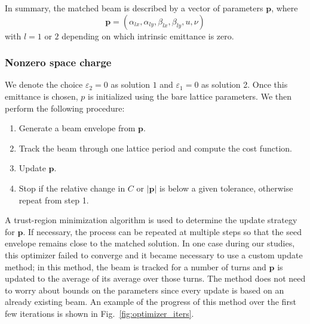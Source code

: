 %

In summary, the matched beam is described by a vector of parameters $\mathbf{p}$, where
%
\begin{equation} \label{eq:twiss_params_4D}
    \mathbf{p} = (\alpha_{lx}, \alpha_{ly}, \beta_{lx}, \beta_{ly}, u, \nu)
\end{equation}
%
with $l = 1$ or $2$ depending on which intrinsic emittance is zero.



\subsubsection{Nonzero space charge}

We denote the choice $\varepsilon_2 = 0$ as solution $1$ and $\varepsilon_1 = 0$ as solution 2. Once this emittance is chosen, $p$ is initialized using the bare lattice parameters. We then perform the following procedure:
%
\begin{enumerate}
  \item Generate a beam envelope from $\mathbf{p}$.
  \item Track the beam through one lattice period and compute the cost function.
  \item Update $\mathbf{p}$.
  \item Stop if the relative change in $C$ or $|\mathbf{p}|$ is below a given tolerance, otherwise repeat from step 1.
\end{enumerate}
%
A trust-region minimization algorithm \cite{Branch1999} is used to determine the update strategy for $\mathbf{p}$. If necessary, the process can be repeated at multiple steps so that the seed envelope remains close to the matched solution. In one case during our studies, this optimizer failed to converge and it became necessary to use a custom update method; in this method, the beam is tracked for a number of turns and $\mathbf{p}$ is updated to the average of its average over those turns. The method does not need to worry about bounds on the parameters since every update is based on an already existing beam. An example of the progress of this method over the first few iterations is shown in Fig.~\ref{fig:optimizer_iters}. 

